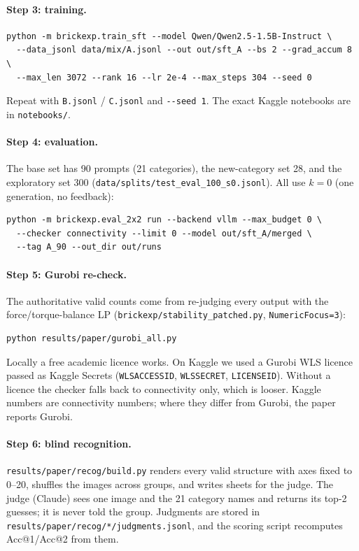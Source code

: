 \paragraph{Step 3: training.}
{\small
\begin{verbatim}
python -m brickexp.train_sft --model Qwen/Qwen2.5-1.5B-Instruct \
  --data_jsonl data/mix/A.jsonl --out out/sft_A --bs 2 --grad_accum 8 \
  --max_len 3072 --rank 16 --lr 2e-4 --max_steps 304 --seed 0
\end{verbatim}}
\noindent Repeat with \texttt{B.jsonl} / \texttt{C.jsonl} and \texttt{-{}-seed 1}. The exact Kaggle notebooks are in \texttt{notebooks/}.

\paragraph{Step 4: evaluation.} The base set has 90 prompts (21 categories), the new-category set 28, and the exploratory set 300 (\texttt{data/splits/test\_eval\_100\_s0.jsonl}). All use $k{=}0$ (one generation, no feedback):
{\small
\begin{verbatim}
python -m brickexp.eval_2x2 run --backend vllm --max_budget 0 \
  --checker connectivity --limit 0 --model out/sft_A/merged \
  --tag A_90 --out_dir out/runs
\end{verbatim}}

\paragraph{Step 5: Gurobi re-check.} The authoritative valid counts come from re-judging every output with the force/torque-balance LP (\texttt{brickexp/stability\_patched.py}, \texttt{NumericFocus=3}):
{\small
\begin{verbatim}
python results/paper/gurobi_all.py
\end{verbatim}}
\noindent Locally a free academic licence works. On Kaggle we used a Gurobi WLS licence passed as Kaggle Secrets (\texttt{WLSACCESSID}, \texttt{WLSSECRET}, \texttt{LICENSEID}). Without a licence the checker falls back to connectivity only, which is looser. Kaggle numbers are connectivity numbers; where they differ from Gurobi, the paper reports Gurobi.

\paragraph{Step 6: blind recognition.} \texttt{results/paper/recog/build.py} renders every valid structure with axes fixed to 0--20, shuffles the images across groups, and writes sheets for the judge. The judge (Claude) sees one image and the 21 category names and returns its top-2 guesses; it is never told the group. Judgments are stored in \texttt{results/paper/recog/*/judgments.jsonl}, and the scoring script recomputes Acc@1/Acc@2 from them.

